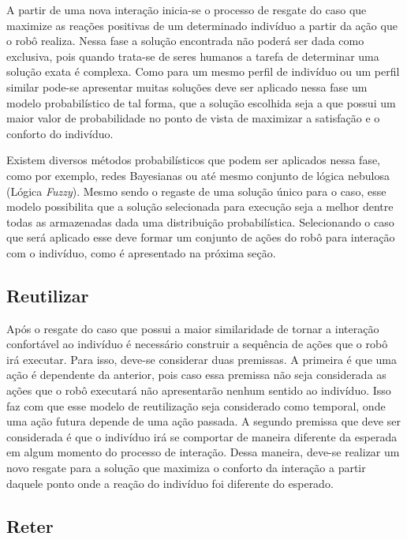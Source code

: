 A partir de uma nova interação inicia-se o processo de resgate do caso que maximize as reações positivas de um determinado indivíduo a partir da ação que o robô realiza. Nessa fase a solução encontrada não poderá ser dada como exclusiva, pois quando trata-se de seres humanos a tarefa de determinar uma solução exata é complexa. Como para um mesmo perfil de indivíduo ou um perfil similar pode-se apresentar muitas soluções deve ser aplicado nessa fase um modelo probabilístico de tal forma, que a solução escolhida seja a que possui um maior valor de probabilidade no ponto de vista de maximizar a satisfação e o conforto do indivíduo.

Existem diversos métodos probabilísticos que podem ser aplicados nessa fase, como por exemplo, redes Bayesianas ou até mesmo conjunto de lógica nebulosa (Lógica \emph{Fuzzy}). Mesmo sendo o regaste de uma solução único para o caso, esse modelo possibilita que a solução selecionada para execução seja a melhor dentre todas as armazenadas dada uma distribuição probabilística. Selecionando o caso que será aplicado esse deve formar um conjunto de ações do robô para interação com o indivíduo, como é apresentado na próxima seção.

\subsection{Reutilizar}
\label{sec:reutilizar}

Após o resgate do caso que possui a maior similaridade de tornar a interação confortável ao indivíduo é necessário construir a sequência de ações que o robô irá executar. Para isso, deve-se considerar duas premissas. A primeira é que uma ação é dependente da anterior, pois caso essa premissa não seja considerada as ações que o robô executará não apresentarão nenhum sentido ao indivíduo. Isso faz com que esse modelo de reutilização seja considerado como temporal, onde uma ação futura depende de uma ação passada. A segundo premissa que deve ser considerada é que o indivíduo irá se comportar de maneira diferente da esperada em algum momento do processo de interação. Dessa maneira, deve-se realizar um novo resgate para a solução que maximiza o conforto da interação a partir daquele ponto onde a reação do indivíduo foi diferente do esperado.

\subsection{Reter}
\label{sec:reter}

